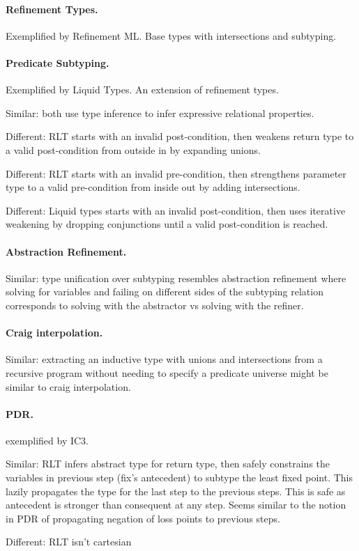 \documentclass[acmsmall]{acmart}
\begin{document}
\paragraph{Refinement Types.}
Exemplified by Refinement ML. Base types with intersections and subtyping.

\paragraph{Predicate Subtyping.}
Exemplified by Liquid Types. An extension of refinement types.

Similar: both use type inference to infer expressive relational properties. 

Different: RLT starts with an invalid post-condition, then weakens return type to a valid post-condition from outside in by expanding unions.

Different: RLT starts with an invalid pre-condition, then strengthens parameter type to a valid pre-condition from inside out by adding intersections.

Different: Liquid types starts with an invalid post-condition, then uses iterative weakening by dropping conjunctions until a valid post-condition is reached.


\paragraph{Abstraction Refinement.} 
Similar: type unification over subtyping resembles abstraction refinement  
where solving for variables and failing on different sides of the subtyping relation corresponds to
solving with the abstractor vs solving with the refiner.

\paragraph{Craig interpolation.} 
Similar: extracting an inductive type with unions and intersections 
from a recursive program without needing to specify a predicate universe might be similar to
craig interpolation.

\paragraph{PDR.}
exemplified by IC3. 

Similar: RLT infers abstract type for return type, 
then safely constrains the variables in previous step (fix's antecedent) 
to subtype the least fixed point.
This lazily propagates the type for the last step to the previous steps.
This is safe as antecedent is stronger than consequent at any step.
Seems similar to the notion in PDR of propagating negation of loss points to previous steps. 

Different: RLT isn't cartesian
\end{document}
